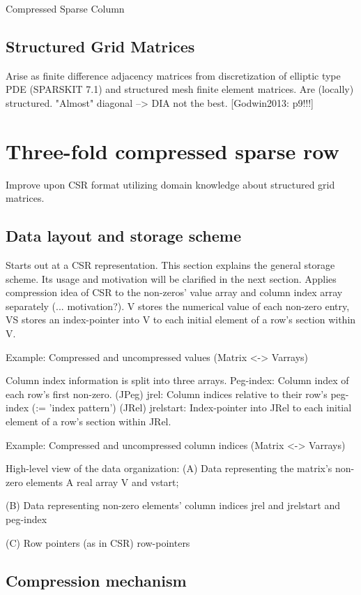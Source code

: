 \documentclass{article}
\begin{document}
    Compressed Sparse Column

  \subsection{Structured Grid Matrices}
    Arise as finite difference adjacency matrices from discretization of elliptic type PDE (SPARSKIT 7.1)
      and structured mesh finite element matrices.
    Are (locally) structured.
    "Almost" diagonal --> DIA not the best. [Godwin2013: p9!!!]

\section{Three-fold compressed sparse row}
  Improve upon CSR format utilizing domain knowledge about structured grid matrices.

  \subsection{Data layout and storage scheme}
    Starts out at a CSR representation. This section explains the general storage scheme. Its usage and motivation will be clarified in the next section.
    Applies compression idea of CSR to the non-zeros' value array and column index array separately (... motivation?).
    V stores the numerical value of each non-zero entry, VS stores an index-pointer into V to each initial element of a row's section within V.

      Example: Compressed and uncompressed values (Matrix <-> Varrays)

    Column index information is split into three arrays.
    Peg-index: Column index of each row's first non-zero. (JPeg)
    jrel: Column indices relative to their row's peg-index (:= 'index pattern') (JRel)
    jrelstart: Index-pointer into JRel to each initial element of a row's section within JRel.

      Example: Compressed and uncompressed column indices (Matrix <-> Varrays)

    High-level view of the data organization:
    (A) Data representing the matrix's non-zero elements
      A real array V  and vstart;

    (B) Data representing non-zero elements' column indices
      jrel and jrelstart and peg-index

    (C) Row pointers (as in CSR) row-pointers

  \subsection{Compression mechanism}
\end{document}
